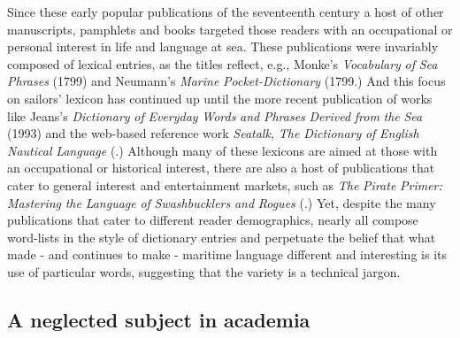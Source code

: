 Since these early popular publications of the seventeenth century a host of other manuscripts, pamphlets and books targeted those readers with an occupational or personal interest in life and language at sea. These publications were invariably composed of lexical entries, as the titles reflect, e.g., Monke’s \textit{Vocabulary} \textit{of} \textit{Sea} \textit{Phrases} (1799) and Neumann’s \textit{Marine} \textit{Pocket-Dictionary} (1799.) And this focus on sailors’ lexicon has continued up until the more recent publication of works like Jeans’s \textit{Dictionary} \textit{of} \textit{Everyday} \textit{Words} \textit{and} \textit{Phrases} \textit{Derived} \textit{from} \textit{the} \textit{S}\textit{ea} (1993) and the web-based reference work \textit{Seatalk,} \textit{The} \textit{Dictionary} \textit{of} \textit{English} \textit{Nautical} \textit{Language} (\citealt{MacKenzie2005}.) Although many of these lexicons are aimed at those with an occupational or historical interest, there are also a host of publications that cater to general interest and entertainment markets, such as \textit{The} \textit{Pirate} \textit{Primer:} \textit{Mastering} \textit{the} \textit{Language} \textit{of} \textit{Swashbucklers} \textit{and} \textit{Rogues} (\citealt{Choundas2007}.) Yet, despite the many publications that cater to different reader demographics, nearly all compose word-lists in the style of dictionary entries and perpetuate the belief that what made - and continues to make - maritime language different and interesting is its use of particular words, suggesting that the variety is a technical jargon. 



\subsection{\textbf{A} \textbf{neglected} \textbf{subject} \textbf{in} \textbf{academia}}%



